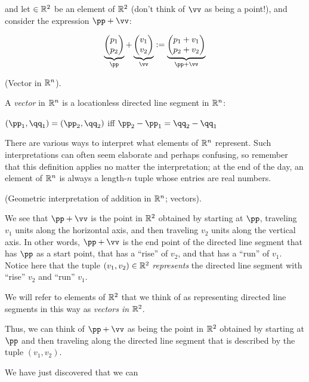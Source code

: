 \begin{deriv}
    and let $ \in \mathbb{R}^2$ be an element of $\mathbb{R}^2$ (don't think of $\vv$ as being a point!), and consider the expression $\pp + \vv$:
    
    \begin{align*}
        \underbrace
        {
            \begin{pmatrix}
                p_1 \\ p_2
            \end{pmatrix}
        }_\pp
        +
        \underbrace
        {
            \begin{pmatrix}
                v_1 \\ v_2
            \end{pmatrix}
        }_\vv
        :=
        \underbrace
        {
            \begin{pmatrix}
                p_1 + v_1 \\ p_2 + v_2
            \end{pmatrix}
        }_{\pp + \vv}
    \end{align*}
\end{deriv}

\begin{defn}
    (Vector in $\mathbb{R}^n$).
    
    A \textit{vector} in $\mathbb{R}^n$ is a locationless directed line segment in $\mathbb{R}^n$:
    
    $(\pp_1, \qq_1) = (\pp_2, \qq_2)$ iff $\pp_2 - \pp_1 = \qq_2 - \qq_1$
\end{defn}

\begin{remark}
    There are various ways to interpret what elements of $\mathbb{R}^n$ represent. Such interpretations can often seem elaborate and perhaps confusing, so remember that this definition applies no matter the interpretation; at the end of the day, an element of $\mathbb{R}^n$ is always a length-$n$ tuple whose entries are real numbers.
\end{remark}

\begin{deriv}
    (Geometric interpretation of addition in $\mathbb{R}^n$; vectors).

    
    
    We see that $\pp + \vv$ is the point in $\mathbb{R}^2$ obtained by starting at $\pp$, traveling $v_1$ units along the horizontal axis, and then traveling $v_2$ units along the vertical axis. In other words, $\pp + \vv$ is the end point of the directed line segment that has $\pp$ as a start point, that has a ``rise'' of $v_2$, and that has a ``run'' of $v_1$. Notice here that the tuple $(v_1, v_2) \in \mathbb{R}^2$ \textit{represents} the directed line segment with ``rise'' $v_2$ and ``run'' $v_1$.
    
    We will refer to elements of $\mathbb{R}^2$ that we think of as representing directed line segments in this way as \textit{vectors in $\mathbb{R}^2$}.
    
    
    Thus, we can think of $\pp + \vv$ as being the point in $\mathbb{R}^2$ obtained by starting at $\pp$ and then traveling along the directed line segment that is described by the tuple $(v_1, v_2)$.
    
     We have just discovered that we can 
\end{deriv}

